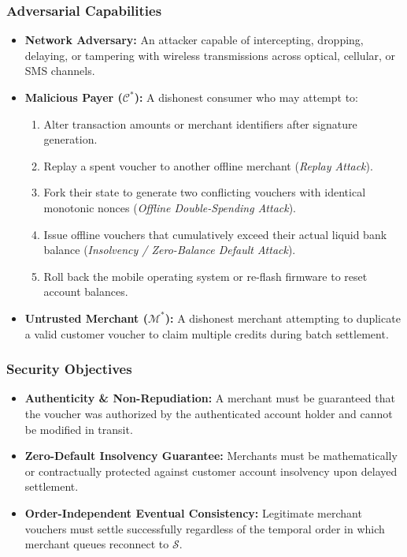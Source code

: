 \documentclass[conference]{IEEEtran}
\begin{document}
\subsubsection{Adversarial Capabilities}
\begin{itemize}
    \item \textbf{Network Adversary:} An attacker capable of intercepting, dropping, delaying, or tampering with wireless transmissions across optical, cellular, or SMS channels.
    \item \textbf{Malicious Payer ($\mathcal{C}^*$):} A dishonest consumer who may attempt to:
    \begin{enumerate}
        \item Alter transaction amounts or merchant identifiers after signature generation.
        \item Replay a spent voucher to another offline merchant (\textit{Replay Attack}).
        \item Fork their state to generate two conflicting vouchers with identical monotonic nonces (\textit{Offline Double-Spending Attack}).
        \item Issue offline vouchers that cumulatively exceed their actual liquid bank balance (\textit{Insolvency / Zero-Balance Default Attack}).
        \item Roll back the mobile operating system or re-flash firmware to reset account balances.
    \end{enumerate}
    \item \textbf{Untrusted Merchant ($\mathcal{M}^*$):} A dishonest merchant attempting to duplicate a valid customer voucher to claim multiple credits during batch settlement.
\end{itemize}

\subsubsection{Security Objectives}
\begin{itemize}
    \item \textbf{Authenticity \& Non-Repudiation:} A merchant must be guaranteed that the voucher was authorized by the authenticated account holder and cannot be modified in transit.
    \item \textbf{Zero-Default Insolvency Guarantee:} Merchants must be mathematically or contractually protected against customer account insolvency upon delayed settlement.
    \item \textbf{Order-Independent Eventual Consistency:} Legitimate merchant vouchers must settle successfully regardless of the temporal order in which merchant queues reconnect to $\mathcal{S}$.
\end{itemize}
\end{document}
